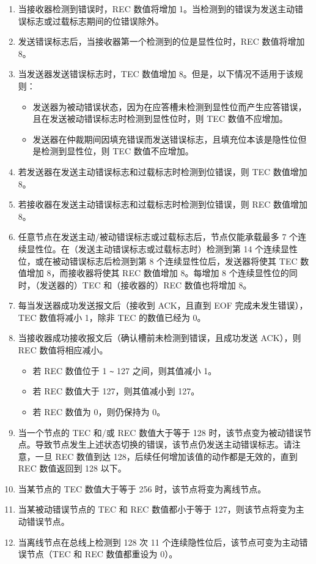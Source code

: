 \documentclass[main\_\_CN.tex]{subfiles}
\begin{document}
\begin{enumerate}
    \item 当接收器检测到错误时，REC 数值将增加 1。当检测到的错误为发送主动错误标志或过载标志期间的位错误除外。
    \item 发送错误标志后，当接收器第一个检测到的位是显性位时，REC 数值将增加 8。
    \item 当发送器发送错误标志时，TEC 数值增加 8。但是，以下情况不适用于该规则：
    \begin{itemize}
        \item 发送器为被动错误状态，因为在应答槽未检测到显性位而产生应答错误，且在发送被动错误标志时检测到显性位时，则 TEC 数值不应增加。
        \item 发送器在仲裁期间因填充错误而发送错误标志，且填充位本该是隐性位但是检测到显性位，则 TEC 数值不应增加。
    \end{itemize}
    \item 若发送器在发送主动错误标志和过载标志时检测到位错误，则 TEC 数值增加 8。
    \item 若接收器在发送主动错误标志和过载标志时检测到位错误，则 REC 数值增加 8。
    \item 任意节点在发送主动/被动错误标志或过载标志后，节点仅能承载最多 7 个连续显性位。在（发送主动错误标志或过载标志时）检测到第 14 个连续显性位，或在被动错误标志后检测到第 8 个连续显性位后，发送器将使其 TEC 数值增加 8，而接收器将使其 REC 数值增加 8。每增加 8 个连续显性位的同时，（发送器的）TEC 和（接收器的）REC 数值也将增加 8。
    \item 每当发送器成功发送报文后（接收到 ACK，且直到 EOF 完成未发生错误），TEC 数值将减小 1，除非 TEC 的数值已经为 0。
    \item 当接收器成功接收报文后（确认槽前未检测到错误，且成功发送 ACK），则 REC 数值将相应减小。
    \begin{itemize}
        \item 若 REC 数值位于 1 \verb+~+ 127 之间，则其值减小 1。
        \item 若 REC 数值大于 127，则其值减小到 127。
        \item 若 REC 数值为 0，则仍保持为 0。
    \end{itemize}
    \item 当一个节点的 TEC 和/或 REC 数值大于等于 128 时，该节点变为被动错误节点。导致节点发生上述状态切换的错误，该节点仍发送主动错误标志。请注意，一旦 REC 数值到达 128，后续任何增加该值的动作都是无效的，直到 REC 数值返回到 128 以下。
    \item 当某节点的 TEC 数值大于等于 256 时，该节点将变为离线节点。
    \item 当某被动错误节点的 TEC 和 REC 数值都小于等于 127，则该节点将变为主动错误节点。
    \item 当离线节点在总线上检测到 128 次 11 个连续隐性位后，该节点可变为主动错误节点（TEC 和 REC 数值都重设为 0）。
\end{enumerate}
\end{document}
